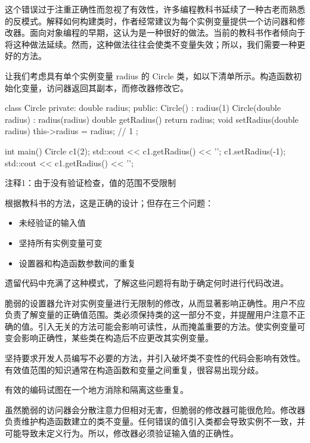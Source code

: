 这个错误过于注重正确性而忽视了有效性，许多编程教科书延续了一种古老而熟悉的反模式。解释如何构建类时，作者经常建议为每个实例变量提供一个访问器和修改器。面向对象编程的早期，这认为是一种很好的做法。当前的教科书作者倾向于将这种做法延续。然而，这种做法往往会使类不变量失效；所以，我们需要一种更好的方法。


让我们考虑具有单个实例变量 radius 的 Circle 类，如以下清单所示。构造函数初始化变量，访问器返回其副本，而修改器修改它。


\begin{cpp}
class Circle {
private:
  double radius;
public:
  Circle() : radius(1) {}
  Circle(double radius) : radius(radius) {}
  double getRadius() { return radius; }
  void setRadius(double radius) { this->radius = radius; } // 1
};

int main() {
  Circle c1(2);
  std::cout << c1.getRadius() << '\n';
  c1.setRadius(-1);
  std::cout << c1.getRadius() << '\n';
}
\end{cpp}

{\footnotesize
注释1：由于没有验证检查，值的范围不受限制
}

根据教科书的方法，这是正确的设计；但存在三个问题：

\begin{itemize}
\item
未经验证的输入值

\item
坚持所有实例变量可变

\item
设置器和构造函数参数间的重复
\end{itemize}

遗留代码中充满了这种模式，了解这些问题将有助于确定何时进行代码改进。

脆弱的设置器允许对实例变量进行无限制的修改，从而显著影响正确性。用户不应负责了解变量的正确值范围。类必须保持类的这一部分不变，并提醒用户注意不正确的值。引入无关的方法可能会影响可读性，从而掩盖重要的方法。使实例变量可变会影响正确性，某些类在构造后不应更改其实例变量。

坚持要求开发人员编写不必要的方法，并引入破坏类不变性的代码会影响有效性。有效值范围的知识通常在构造函数和变量之间重复，很容易出现分歧。

有效的编码试图在一个地方消除和隔离这些重复。


虽然脆弱的访问器会分散注意力但相对无害，但脆弱的修改器可能很危险。修改器负责维护构造函数建立的类不变量。任何错误的值引入类都会导致实例不一致，并可能导致未定义行为。所以，修改器必须验证输入值的正确性。

